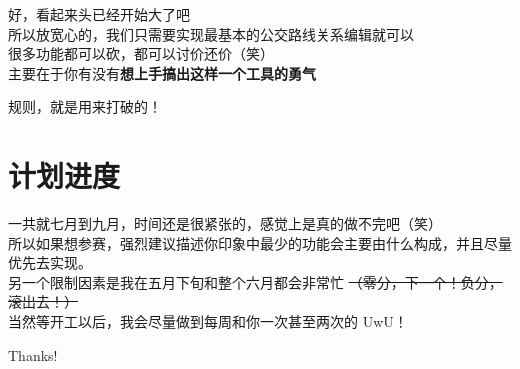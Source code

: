\documentclass{beamer}
\begin{document}
\begin{frame}
    \Large
    好，看起来头已经开始大了吧 \\
    \large
    \quad \quad 所以放宽心的，我们只需要实现最基本的公交路线关系编辑就可以 \\
    \quad \quad 很多功能都可以砍，都可以讨价还价（笑）\\
    \quad \quad 主要在于你有没有\textbf{想上手搞出这样一个工具的勇气}
\end{frame}

\begin{frame}
    \Huge
    规则，就是用来打破的！
\end{frame}

\section{计划进度}
\begin{frame}
    \quad \quad 一共就七月到九月，时间还是很紧张的，感觉上是真的做不完吧（笑） \\
    
    \quad \quad 所以如果想参赛，强烈建议描述你印象中最少的功能会主要由什么构成，并且尽量优先去实现。\\

    \quad \quad 另一个限制因素是我在五月下旬和整个六月都会非常忙
    \sout{\small （零分，下一个！负分，滚出去！）}\\

    \quad \quad 当然等开工以后，我会尽量做到每周和你一次甚至两次的 UwU！
\end{frame}

\begin{frame}
    \begin{center}
        {\Huge\calligra Thanks!}
    \end{center}
\end{frame}
\end{document}
